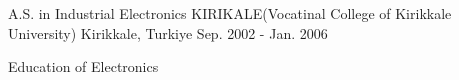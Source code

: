 
\begin{cventries}

  \cventry
    {A.S. in Industrial Electronics} %
    {KIRIKALE(Vocatinal College of Kirikkale University)} %
    {Kirikkale, Turkiye} %
    {Sep. 2002 - Jan. 2006} %
    {
      \begin{cvitems} %
        \item {Education of Electronics}
      \end{cvitems}
    }

\end{cventries}
